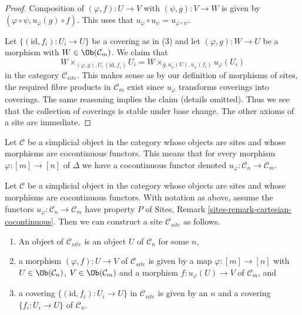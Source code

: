 \begin{proof}
Composition of $(\varphi, f) : U \to V$ with $(\psi, g) : V \to W$
is given by $(\varphi \circ \psi, u_\varphi(g) \circ f)$.
This uses that $u_\varphi \circ u_\psi = u_{\varphi \circ \psi}$.

\medskip\noindent
Let $\{(\text{id}, f_i) :  U_i \to U\}$ be a covering as in (3)
and let $(\varphi, g) : W \to U$ be a morphism with
$W \in \Ob(\mathcal{C}_m)$. We claim that
$$
W \times_{(\varphi, g), U, (\text{id}, f_i)} U_i =
W \times_{g, u_\varphi(U), u_\varphi(f_i)} u_\varphi(U_i)
$$
in the category $\mathcal{C}_{site}$. This makes sense as by our
definition of morphisms of sites, the required fibre products
in $\mathcal{C}_m$ exist since $u_\varphi$ transforms coverings into
coverings. The same reasoning implies the claim (details omitted).
Thus we see that the collection of coverings is stable under base
change. The other axioms of a site are immediate.
\end{proof}

\noindent
Let $\mathcal{C}$ be a simplicial object in the category whose objects are
sites and whose morphisms are cocontinuous functors. This means that for
every morphism $\varphi : [m] \to [n]$ of $\Delta$ we have a cocontinuous
functor denoted $u_\varphi : \mathcal{C}_n \to \mathcal{C}_m$.

\begin{lemma}
\label{lemma-simplicial-cocontinuous-site}
Let $\mathcal{C}$ be a simplicial object in the category whose objects are
sites and whose morphisms are cocontinuous functors. With notation as above,
assume the functors $u_\varphi : \mathcal{C}_n \to \mathcal{C}_m$
have property $P$ of Sites, Remark \ref{sites-remark-cartesian-cocontinuous}.
Then we can construct a site $\mathcal{C}_{site}$ as follows.
\begin{enumerate}
\item An object of $\mathcal{C}_{site}$ is an object $U$ of
$\mathcal{C}_n$ for some $n$,
\item a morphism $(\varphi, f) : U \to V$ of $\mathcal{C}_{site}$
is given by a map $\varphi : [m] \to [n]$ with
$U \in \Ob(\mathcal{C}_n)$, $V \in \Ob(\mathcal{C}_m)$
and a morphism $f : u_\varphi(U) \to V$ of $\mathcal{C}_m$, and
\item a covering $\{(\text{id}, f_i) :  U_i \to U\}$ in $\mathcal{C}_{site}$
is given by an $n$ and a covering $\{f_i : U_i \to U\}$
of $\mathcal{C}_n$.
\end{enumerate}
\end{lemma}

